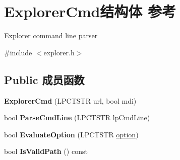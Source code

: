 \hypertarget{struct_explorer_cmd}{}\section{Explorer\+Cmd结构体 参考}
\label{struct_explorer_cmd}


Explorer command line parser  




{\ttfamily \#include $<$explorer.\+h$>$}

\subsection*{Public 成员函数}
\begin{DoxyCompactItemize}
\item 
\mbox{\label{struct_explorer_cmd_af8f310aecf43cabd814ff3cabe6fc4bb}} 
{\bfseries Explorer\+Cmd} (L\+P\+C\+T\+S\+TR url, bool mdi)
\item 
\mbox{\label{struct_explorer_cmd_af416ce777c094300789bf981f339eee2}} 
bool {\bfseries Parse\+Cmd\+Line} (L\+P\+C\+T\+S\+TR lp\+Cmd\+Line)
\item 
\mbox{\label{struct_explorer_cmd_a2083f9d13f2c32dde3807113c7b44f61}} 
bool {\bfseries Evaluate\+Option} (L\+P\+C\+T\+S\+TR \hyperlink{structoption}{option})
\item 
\mbox{\label{struct_explorer_cmd_a15bcd74c101fe7322a7cc3f8e759fc61}} 
bool {\bfseries Is\+Valid\+Path} () const
\end{DoxyCompactItemize}
